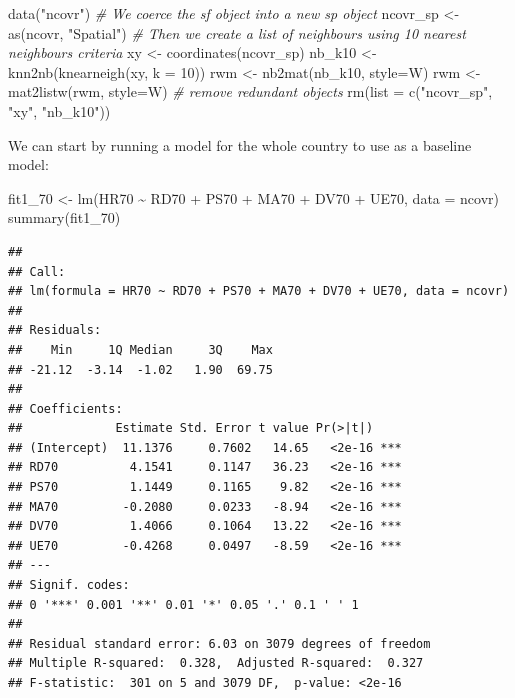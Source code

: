 \documentclass[
  krantz2]{krantz}
\makeatletter
\newenvironment{Shaded}{\begin{snugshade}}{\end{snugshade}}
\newcommand{\AttributeTok}[1]{\textcolor[rgb]{0.61,0.61,0.61}{#1}}
\newcommand{\CommentTok}[1]{\textcolor[rgb]{0.37,0.37,0.37}{\textit{#1}}}
\newcommand{\DecValTok}[1]{\textcolor[rgb]{0.06,0.06,0.06}{#1}}
\newcommand{\FunctionTok}[1]{\textcolor[rgb]{0,0,0}{#1}}
\newcommand{\NormalTok}[1]{#1}
\newcommand{\OtherTok}[1]{\textcolor[rgb]{0.37,0.37,0.37}{#1}}
\newcommand{\SpecialCharTok}[1]{\textcolor[rgb]{0,0,0}{#1}}
\newcommand{\StringTok}[1]{\textcolor[rgb]{0.5,0.5,0.5}{#1}}
\newenvironment{kframe}{%
\medskip{}
\setlength{\fboxsep}{.8em}
 \def\at@end@of@kframe{}%
 \ifinner\ifhmode%
  \def\at@end@of@kframe{\end{minipage}}%
  \begin{minipage}{\columnwidth}%
 \fi\fi%
 \def\FrameCommand##1{\hskip\@totalleftmargin \hskip-\fboxsep
 \colorbox{shadecolor}{##1}\hskip-\fboxsep
     \hskip-\linewidth \hskip-\@totalleftmargin \hskip\columnwidth}%
 \MakeFramed {\advance\hsize-\width
   \@totalleftmargin\z@ \linewidth\hsize
   \@setminipage}}%
 {\par\unskip\endMakeFramed%
 \at@end@of@kframe}
\renewenvironment{Shaded}{\begin{kframe}}{\end{kframe}}
\makeatother
\begin{document}
\begin{Shaded}
\begin{Highlighting}[]
\FunctionTok{data}\NormalTok{(}\StringTok{"ncovr"}\NormalTok{)}
\CommentTok{\# We coerce the sf object into a new sp object}
\NormalTok{ncovr\_sp }\OtherTok{\textless{}{-}} \FunctionTok{as}\NormalTok{(ncovr, }\StringTok{"Spatial"}\NormalTok{)}
\CommentTok{\# Then we create a list of neighbours using 10 nearest neighbours criteria}
\NormalTok{xy }\OtherTok{\textless{}{-}} \FunctionTok{coordinates}\NormalTok{(ncovr\_sp)}
\NormalTok{nb\_k10 }\OtherTok{\textless{}{-}} \FunctionTok{knn2nb}\NormalTok{(}\FunctionTok{knearneigh}\NormalTok{(xy, }\AttributeTok{k =} \DecValTok{10}\NormalTok{))}
\NormalTok{rwm }\OtherTok{\textless{}{-}} \FunctionTok{nb2mat}\NormalTok{(nb\_k10, }\AttributeTok{style=}\StringTok{\textquotesingle{}W\textquotesingle{}}\NormalTok{)}
\NormalTok{rwm }\OtherTok{\textless{}{-}} \FunctionTok{mat2listw}\NormalTok{(rwm, }\AttributeTok{style=}\StringTok{\textquotesingle{}W\textquotesingle{}}\NormalTok{)}
\CommentTok{\# remove redundant objects}
\FunctionTok{rm}\NormalTok{(}\AttributeTok{list =} \FunctionTok{c}\NormalTok{(}\StringTok{"ncovr\_sp"}\NormalTok{, }\StringTok{"xy"}\NormalTok{, }\StringTok{"nb\_k10"}\NormalTok{))}
\end{Highlighting}
\end{Shaded}

We can start by running a model for the whole country to use as a baseline model:

\begin{Shaded}
\begin{Highlighting}[]
\NormalTok{fit1\_70 }\OtherTok{\textless{}{-}} \FunctionTok{lm}\NormalTok{(HR70 }\SpecialCharTok{\textasciitilde{}}\NormalTok{ RD70 }\SpecialCharTok{+}\NormalTok{ PS70 }\SpecialCharTok{+}\NormalTok{ MA70 }\SpecialCharTok{+}\NormalTok{ DV70 }\SpecialCharTok{+}\NormalTok{ UE70, }\AttributeTok{data =}\NormalTok{ ncovr)}
\FunctionTok{summary}\NormalTok{(fit1\_70)}
\end{Highlighting}
\end{Shaded}

\begin{verbatim}
## 
## Call:
## lm(formula = HR70 ~ RD70 + PS70 + MA70 + DV70 + UE70, data = ncovr)
## 
## Residuals:
##    Min     1Q Median     3Q    Max 
## -21.12  -3.14  -1.02   1.90  69.75 
## 
## Coefficients:
##             Estimate Std. Error t value Pr(>|t|)    
## (Intercept)  11.1376     0.7602   14.65   <2e-16 ***
## RD70          4.1541     0.1147   36.23   <2e-16 ***
## PS70          1.1449     0.1165    9.82   <2e-16 ***
## MA70         -0.2080     0.0233   -8.94   <2e-16 ***
## DV70          1.4066     0.1064   13.22   <2e-16 ***
## UE70         -0.4268     0.0497   -8.59   <2e-16 ***
## ---
## Signif. codes:  
## 0 '***' 0.001 '**' 0.01 '*' 0.05 '.' 0.1 ' ' 1
## 
## Residual standard error: 6.03 on 3079 degrees of freedom
## Multiple R-squared:  0.328,  Adjusted R-squared:  0.327 
## F-statistic:  301 on 5 and 3079 DF,  p-value: <2e-16
\end{verbatim}
\end{document}
